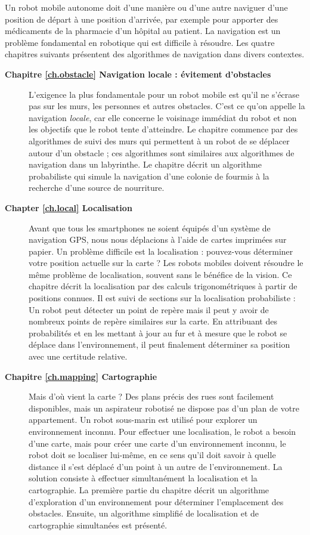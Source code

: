 {Un robot mobile autonome doit d'une manière ou d'une autre naviguer d'une position de départ à une position d'arrivée, par exemple pour apporter des médicaments de la pharmacie d'un hôpital au patient. La navigation est un problème fondamental en robotique qui est difficile à résoudre. Les quatre chapitres suivants présentent des algorithmes de navigation dans divers contextes.
\begin{description}
\item [\textbf{Chapitre \ref{ch.obstacle} Navigation locale : évitement d'obstacles}] L'exigence la plus fondamentale pour un robot mobile est qu'il ne s'écrase pas sur les murs, les personnes et autres obstacles. C'est ce qu'on appelle la navigation \emph{locale}, car elle concerne le voisinage immédiat du robot et non les objectifs que le robot tente d'atteindre. Le chapitre commence par des algorithmes de suivi des murs qui permettent à un robot de se déplacer autour d'un obstacle ; ces algorithmes sont similaires aux algorithmes de navigation dans un labyrinthe. Le chapitre décrit un algorithme probabiliste qui simule la navigation d'une colonie de fourmis à la recherche d'une source de nourriture.
\smallskip
\item [\textbf{Chapter \ref{ch.local} Localisation}] Avant que tous les smartphones ne soient équipés d'un système de navigation GPS, nous nous déplacions à l'aide de cartes imprimées sur papier. Un problème difficile est la localisation : pouvez-vous déterminer votre position actuelle sur la carte ? Les robots mobiles doivent résoudre le même problème de localisation, souvent sans le bénéfice de la vision. Ce chapitre décrit la localisation par des calculs trigonométriques à partir de positions connues. Il est suivi de sections sur la localisation probabiliste : Un robot peut détecter un point de repère mais il peut y avoir de nombreux points de repère similaires sur la carte. En attribuant des probabilités et en les mettant à jour au fur et à mesure que le robot se déplace dans l'environnement, il peut finalement déterminer sa position avec une certitude relative.
\smallskip
\item [\textbf{Chapitre \ref{ch.mapping} Cartographie}] Mais d'où vient la carte ? Des plans précis des rues sont facilement disponibles, mais un aspirateur robotisé ne dispose pas d'un plan de votre appartement. Un robot sous-marin est utilisé pour explorer un environnement inconnu. Pour effectuer une localisation, le robot a besoin d'une carte, mais pour créer une carte d'un environnement inconnu, le robot doit se localiser lui-même, en ce sens qu'il doit savoir à quelle distance il s'est déplacé d'un point à un autre de l'environnement. La solution consiste à effectuer simultanément la localisation et la cartographie. La première partie du chapitre décrit un algorithme d'exploration d'un environnement pour déterminer l'emplacement des obstacles. Ensuite, un algorithme simplifié de localisation et de cartographie simultanées est présenté.

\end{description}}
